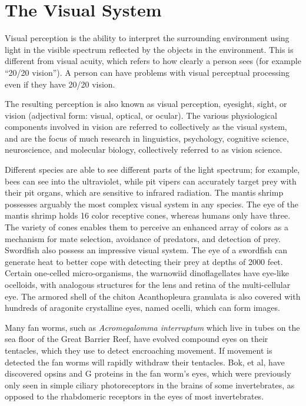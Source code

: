 \hypertarget{the-visual-system}{%
\chapter{The Visual System}\label{the-visual-system}}

Visual perception is the ability to interpret the surrounding environment using light in the visible spectrum reflected by the objects in the environment. This is different from visual acuity, which refers to how clearly a person sees (for example ``20/20 vision''). A person can have problems with visual perceptual processing even if they have 20/20 vision.

The resulting perception is also known as visual perception, eyesight, sight, or vision (adjectival form: visual, optical, or ocular). The various physiological components involved in vision are referred to collectively as the visual system, and are the focus of much research in linguistics, psychology, cognitive science, neuroscience, and molecular biology, collectively referred to as vision science.

Different species are able to see different parts of the light spectrum; for example, bees can see into the ultraviolet, while pit vipers can accurately target prey with their pit organs, which are sensitive to infrared radiation. The mantis shrimp possesses arguably the most complex visual system in any species. The eye of the mantis shrimp holds 16 color receptive cones, whereas humans only have three. The variety of cones enables them to perceive an enhanced array of colors as a mechanism for mate selection, avoidance of predators, and detection of prey. Swordfish also possess an impressive visual system. The eye of a swordfish can generate heat to better cope with detecting their prey at depths of 2000 feet. Certain one-celled micro-organisms, the warnowiid dinoflagellates have eye-like ocelloids, with analogous structures for the lens and retina of the multi-cellular eye. The armored shell of the chiton Acanthopleura granulata is also covered with hundreds of aragonite crystalline eyes, named ocelli, which can form images.

Many fan worms, such as \emph{Acromegalomma interruptum} which live in tubes on the sea floor of the Great Barrier Reef, have evolved compound eyes on their tentacles, which they use to detect encroaching movement. If movement is detected the fan worms will rapidly withdraw their tentacles. Bok, et al, have discovered opsins and G proteins in the fan worm's eyes, which were previously only seen in simple ciliary photoreceptors in the brains of some invertebrates, as opposed to the rhabdomeric receptors in the eyes of most invertebrates.

